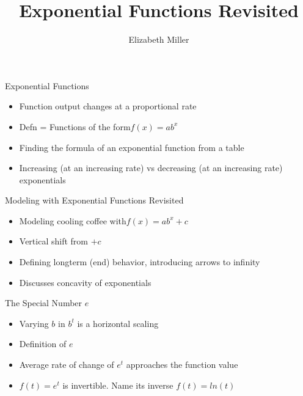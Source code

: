\documentclass{ximera}
\author{Elizabeth Miller}
\title{Exponential Functions Revisited}
\begin{document}
\begin{abstract}
\end{abstract}
\maketitle


\begin{objectives}

\item Exponential Functions
\begin{itemize}
	\item Function output changes at a proportional rate 
	\item Defn = Functions of the form$ f(x)=ab^x$ 
	\item Finding the formula of an exponential function from a table 
	\item Increasing (at an increasing rate) vs decreasing (at an increasing rate) exponentials
\end{itemize}


\item Modeling with Exponential Functions Revisited 
\begin{itemize}
	\item Modeling cooling coffee with$f(x)= ab^x+c$ 
	\item Vertical shift from $+c$
	\item Defining longterm (end) behavior, introducing arrows to infinity
	\item Discusses concavity of exponentials 
\end{itemize}


\item The Special Number $e$ 
\begin{itemize}
	\item Varying $b$ in $b^t$ is a horizontal scaling 
	\item Definition of $e$ 
	\item Average rate of change of $e^t$ approaches the function value 
	\item $f(t)=e^t$ is invertible.  Name its inverse $f(t)=ln(t)$  
\end{itemize}

\end{objectives}
\end{document}
